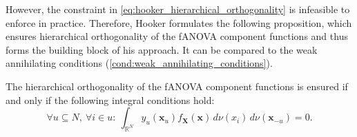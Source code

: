 However, the constraint in \autoref{eq:hooker_hierarchical_orthogonality} is infeasible to enforce in practice.
Therefore, Hooker formulates the following proposition, which ensures hierarchical orthogonality of the fANOVA component functions and thus forms the building block of his approach. It can be compared to the weak annihilating conditions (\autoref{cond:weak_annihilating_conditions}).
\begin{proposition}\label{prop:hooker_lemma_1}
    The hierarchical orthogonality of the fANOVA component functions is ensured if and only if the following integral conditions hold:
    \begin{equation}
\forall u \subseteq N,\ \forall i \in u:\ \int_{\mathbb{R}^N} y_u(\boldsymbol{x}_u) f_{\boldsymbol{X}}(\boldsymbol{x})\, d \nu (x_i)\, d \nu (\boldsymbol{x}_{-u}) = 0.
\end{equation}
\end{proposition}

